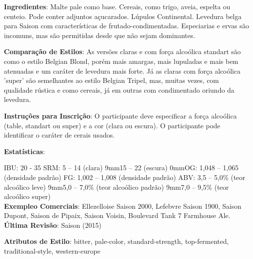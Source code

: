\textbf{Ingredientes}: Malte pale como base. Cereais, como trigo, aveia, espelta ou centeio. Pode conter adjuntos açucarados. Lúpulos Continental. Levedura belga para Saison com características de frutado-condimentadas. Especiarias e ervas são incomuns, mas são permitidas desde que não sejam dominantes.

\textbf{Comparação de Estilos}: As versões claras e com força alcoólica standart são como o estilo Belgian Blond, porém mais amargas, mais lupuladas e mais bem atenuadas e um caráter de levedura mais forte. Já as claras com força alcoólica 'super' são semelhantes ao estilo Belgian Tripel, mas, muitas vezes, com qualidade rústica e como cereais, já em outras com condimentado oriundo da levedura.

\textbf{Instruções para Inscrição}: O participante deve especificar a força alcoólica (table, standart ou super) e a cor (clara ou escura). O participante pode identificar o caráter de cerais usados.

\textbf{Estatísticas}:

IBU: 20 - 35
SRM: 5 – 14 (clara)
\leftskip9mm15 – 22 (escura)
\leftskip0mmOG: 1,048 – 1,065 (densidade padrão)
FG: 1,002 – 1,008 (densidade padrão)
ABV: 3,5 – 5,0\% (teor alcoólico leve)
\leftskip9mm5,0 – 7,0\% (teor alcoólico padrão)
\leftskip9mm7,0 – 9,5\% (teor alcoólico super)\\
\textbf{Exempleo Comerciais}: Ellezelloise Saison 2000, Lefebvre Saison 1900, Saison Dupont, Saison de Pipaix, Saison Voisin, Boulevard Tank 7 Farmhouse Ale. \\
\textbf{Última Revisão}: Saison (2015)

\textbf{Atributos de Estilo}: bitter, pale-color, standard-strength, top-fermented, traditional-style, western-europe
